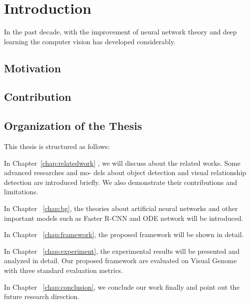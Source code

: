 \chapter{Introduction}
\label{chap:introduction}
\setcounter{page}{1}
In the past decade, with the improvement of neural network theory and deep learning the computer vision has developed considerably. 

\section{Motivation}

\section{Contribution}

\section{Organization of the Thesis}
This thesis is structured as follows:

In Chapter~\ref{chap:relatedwork} , we will discuss about the related works. Some advanced researches and mo- dels about object detection and visual relationship detection are introduced briefly. We also demonstrate their contributions and limitations.

In Chapter ~\ref{chap:bg}, the theories about artificial neural networks and other important models such as Faster R-CNN and ODE network will be introduced.

In Chapter ~\ref{chap:framework}, the proposed framework will be shown in detail.

In Chapter ~\ref{chap:experiment}, the experimental results will be presented and analyzed in detail. Our proposed framework are evaluated on Visual Genome with three standard evaluation metrics.

In Chapter ~\ref{chap:conclusion}, we conclude our work finally and point out the future research direction.